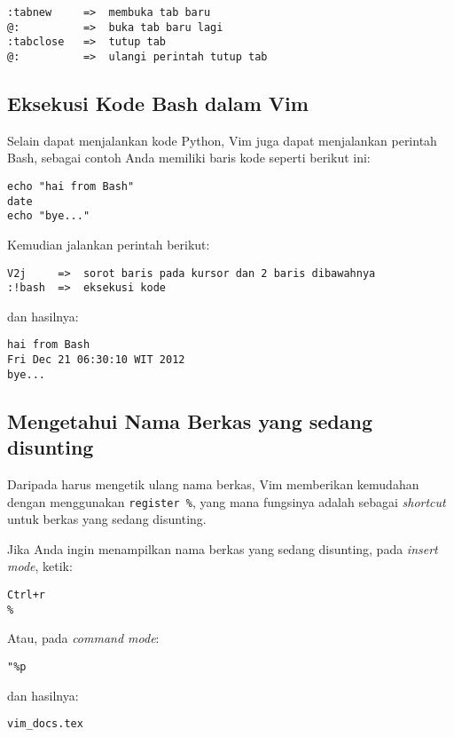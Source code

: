 \documentclass{article}
\begin{document}
\begin{verbatim}
:tabnew     =>  membuka tab baru
@:          =>  buka tab baru lagi
:tabclose   =>  tutup tab 
@:          =>  ulangi perintah tutup tab
\end{verbatim}

\subsection{Eksekusi Kode Bash dalam Vim}

Selain dapat menjalankan kode Python, Vim juga dapat
menjalankan perintah Bash, sebagai contoh Anda memiliki
baris kode seperti berikut ini:

\begin{verbatim}
echo "hai from Bash"
date
echo "bye..."
\end{verbatim}

Kemudian jalankan perintah berikut:

\begin{verbatim}
V2j     =>  sorot baris pada kursor dan 2 baris dibawahnya
:!bash  =>  eksekusi kode
\end{verbatim}

dan hasilnya:

\begin{verbatim}
hai from Bash
Fri Dec 21 06:30:10 WIT 2012
bye...
\end{verbatim}

\subsection{Mengetahui Nama Berkas yang sedang disunting}
Daripada harus mengetik ulang nama berkas, Vim memberikan
kemudahan dengan menggunakan \verb=register %=, yang mana
fungsinya adalah sebagai \emph{shortcut} untuk berkas yang
sedang disunting.

Jika Anda ingin menampilkan nama berkas yang sedang
disunting, pada \emph{insert mode}, ketik:

\begin{verbatim}
Ctrl+r
%
\end{verbatim}

Atau, pada \emph{command mode}:

\begin{verbatim}
"%p
\end{verbatim}

dan hasilnya:

\begin{verbatim}
vim_docs.tex
\end{verbatim}
\end{document}
